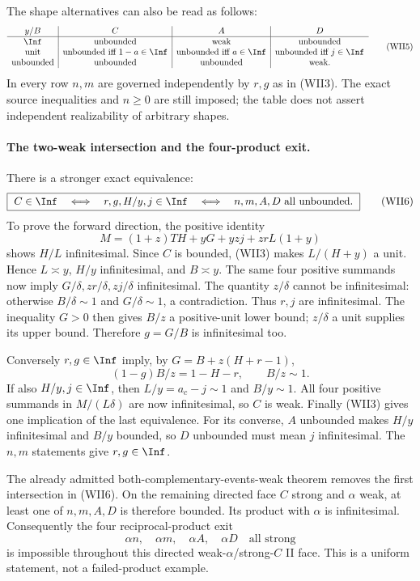 The shape alternatives can also be read as follows:
\[
\begin{array}{c|c|c|c}
 y/B&C&A&D\\ \hline
 \Inf&\text{unbounded}&\text{weak}&\text{unbounded}\\
 \text{unit}&\text{unbounded iff }1-a\in\Inf&
 \text{unbounded iff }a\in\Inf&
 \text{unbounded iff }j\in\Inf\\
 \text{unbounded}&\text{unbounded}&\text{unbounded}&\text{weak}.
\end{array}                                                     \tag{WII5}
\]
In every row $n,m$ are governed independently by $r,g$ as in (WII3).
The exact source inequalities and $n\geq0$ are still imposed; the
table does not assert independent realizability of arbitrary shapes.

\paragraph{The two-weak intersection and the four-product exit.}
There is a stronger exact equivalence:
\[
 \boxed{\ C\in\Inf\quad\Longleftrightarrow\quad
 r,g,H/y,j\in\Inf
 \quad\Longleftrightarrow\quad n,m,A,D\text{ all unbounded}.\ }
                                                               \tag{WII6}
\]
To prove the forward direction, the positive identity
\[
 M=(1+z)TH+yG+yzj+zrL(1+y)
\]
shows $H/L$ infinitesimal. Since $C$ is bounded, (WII3) makes
$L/(H+y)$ a unit. Hence $L\asymp y$, $H/y$ infinitesimal, and
$B\asymp y$. The same four positive summands now imply
$G/\delta,zr/\delta,zj/\delta$ infinitesimal. The quantity
$z/\delta$ cannot be infinitesimal: otherwise $B/\delta\sim1$
and $G/\delta\sim1$, a contradiction. Thus $r,j$ are infinitesimal.
The inequality $G>0$ then gives $B/z$ a positive-unit lower bound;
$z/\delta$ a unit supplies its upper bound. Therefore $g=G/B$ is
infinitesimal too.

Conversely $r,g\in\Inf$ imply, by $G=B+z(H+r-1)$,
\[
 (1-g)B/z=1-H-r,\qquad B/z\sim1.
\]
If also $H/y,j\in\Inf$, then $L/y=a_c-j\sim1$ and
$B/y\sim1$. All four positive summands in $M/(L\delta)$ are now
infinitesimal, so $C$ is weak. Finally (WII3) gives one implication
of the last equivalence. For its converse, $A$ unbounded makes
$H/y$ infinitesimal and $B/y$ bounded, so $D$ unbounded must mean
$j$ infinitesimal. The $n,m$ statements give $r,g\in\Inf$.

The already admitted both-complementary-events-weak theorem removes
the first intersection in (WII6). On the remaining directed face
$C$ strong and $\alpha$ weak, at least one of $n,m,A,D$ is therefore
bounded. Its product with $\alpha$ is infinitesimal. Consequently
the four reciprocal-product exit
\[
 \alpha n,\quad\alpha m,\quad\alpha A,\quad\alpha D
 \quad\text{all strong}
\]
is impossible throughout this directed weak-$\alpha$/strong-$C$
II face. This is a uniform statement, not a failed-product example.

